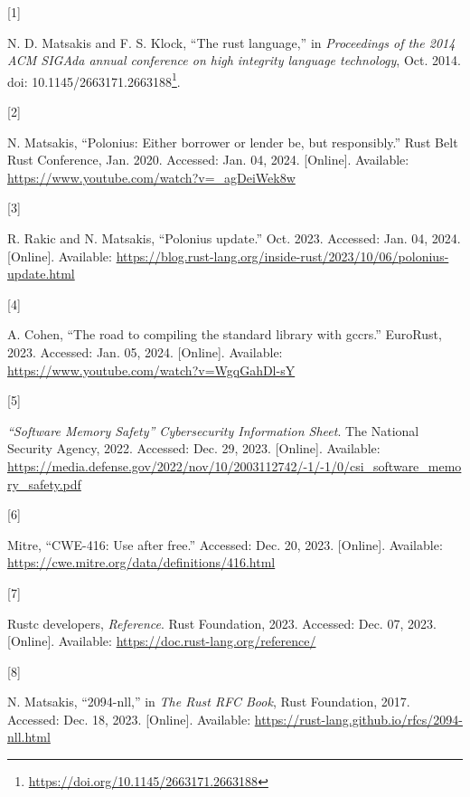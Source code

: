 \documentclass[
  11pt,
  twoside,symmetric]{report}
\newlength{\cslhangindent}
\newlength{\csllabelwidth}
\newenvironment{CSLReferences}[2] %
 {\begin{list}{}{%
  \setlength{\itemindent}{0pt}
  \setlength{\leftmargin}{0pt}
  \setlength{\parsep}{0pt}
  \ifodd #1
   \setlength{\leftmargin}{\cslhangindent}
   \setlength{\itemindent}{-1\cslhangindent}
  \fi
  \setlength{\itemsep}{#2\baselineskip}}}
 {\end{list}}
\newcommand{\CSLLeftMargin}[1]{\parbox[t]{\csllabelwidth}{\strut#1\strut}}
\newcommand{\CSLRightInline}[1]{\parbox[t]{\linewidth - \csllabelwidth}{\strut#1\strut}}
\DeclareRobustCommand{\href}[2]{#2\footnote{\url{#1}}}
\begin{document}
\label{refs}
\begin{CSLReferences}{0}{0}
\CSLLeftMargin{{[}1{]} }%
\CSLRightInline{N. D. Matsakis and F. S. Klock, {``The rust language,''}
in \emph{Proceedings of the 2014 ACM SIGAda annual conference on high
integrity language technology}, Oct. 2014. doi:
\href{https://doi.org/10.1145/2663171.2663188}{10.1145/2663171.2663188}.}

\CSLLeftMargin{{[}2{]} }%
\CSLRightInline{N. Matsakis, {``Polonius: Either borrower or lender be,
but responsibly.''} Rust Belt Rust Conference, Jan. 2020. Accessed: Jan.
04, 2024. {[}Online{]}. Available:
\url{https://www.youtube.com/watch?v=_agDeiWek8w}}

\CSLLeftMargin{{[}3{]} }%
\CSLRightInline{R. Rakic and N. Matsakis, {``Polonius update.''} Oct.
2023. Accessed: Jan. 04, 2024. {[}Online{]}. Available:
\url{https://blog.rust-lang.org/inside-rust/2023/10/06/polonius-update.html}}

\CSLLeftMargin{{[}4{]} }%
\CSLRightInline{A. Cohen, {``The road to compiling the standard library
with gccrs.''} EuroRust, 2023. Accessed: Jan. 05, 2024. {[}Online{]}.
Available: \url{https://www.youtube.com/watch?v=WgqGahDl-sY}}

\CSLLeftMargin{{[}5{]} }%
\CSLRightInline{\emph{{{``Software Memory Safety''}} {C}ybersecurity
{I}nformation {S}heet}. The National Security Agency, 2022. Accessed:
Dec. 29, 2023. {[}Online{]}. Available:
\url{https://media.defense.gov/2022/nov/10/2003112742/-1/-1/0/csi_software_memory_safety.pdf}}

\CSLLeftMargin{{[}6{]} }%
\CSLRightInline{Mitre, {``CWE-416: Use after free.''} Accessed: Dec. 20,
2023. {[}Online{]}. Available:
\url{https://cwe.mitre.org/data/definitions/416.html}}

\CSLLeftMargin{{[}7{]} }%
\CSLRightInline{Rustc developers, \emph{Reference}. Rust Foundation,
2023. Accessed: Dec. 07, 2023. {[}Online{]}. Available:
\url{https://doc.rust-lang.org/reference/}}

\CSLLeftMargin{{[}8{]} }%
\CSLRightInline{N. Matsakis, {``2094-nll,''} in \emph{The {R}ust {RFC}
{B}ook}, Rust Foundation, 2017. Accessed: Dec. 18, 2023. {[}Online{]}.
Available: \url{https://rust-lang.github.io/rfcs/2094-nll.html}}


\end{CSLReferences}
\end{document}
